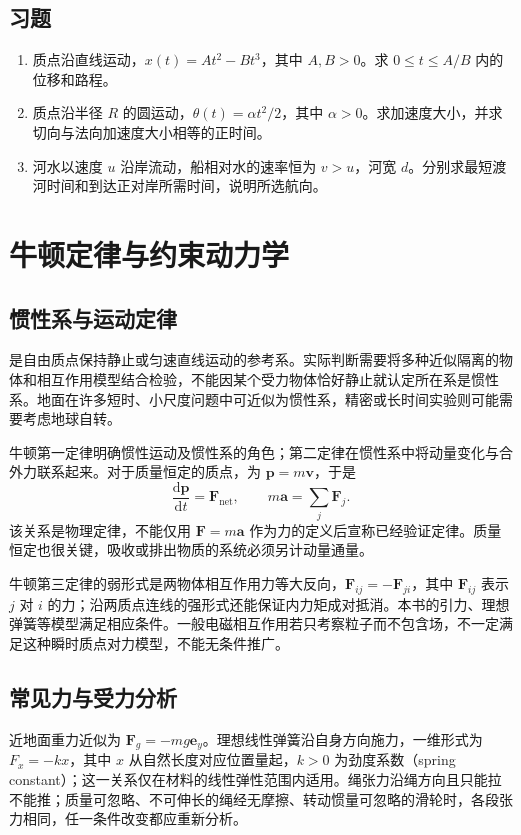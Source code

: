 \documentclass[UTF8,12pt,a4paper,fontset=fandol]{ctexbook}
\begin{document}
\section{习题}
\begin{enumerate}[label=\thechapter.\arabic*,ref=\thechapter.\arabic*]
\item\label{exr:mech-path} 质点沿直线运动，$x(t)=At^2-Bt^3$，其中 $A,B>0$。求 $0\le t\le A/B$ 内的位移和路程。
\item\label{exr:mech-circle} 质点沿半径 $R$ 的圆运动，$\theta(t)=\alpha t^2/2$，其中 $\alpha>0$。求加速度大小，并求切向与法向加速度大小相等的正时间。
\item\label{exr:mech-river} 河水以速度 $u$ 沿岸流动，船相对水的速率恒为 $v>u$，河宽 $d$。分别求最短渡河时间和到达正对岸所需时间，说明所选航向。
\end{enumerate}

\chapter{牛顿定律与约束动力学}
\label{chap:mech-newton}

\section{惯性系与运动定律}
是自由质点保持静止或匀速直线运动的参考系。实际判断需要将多种近似隔离的物体和相互作用模型结合检验，不能因某个受力物体恰好静止就认定所在系是惯性系。地面在许多短时、小尺度问题中可近似为惯性系，精密或长时间实验则可能需要考虑地球自转。

牛顿第一定律明确惯性运动及惯性系的角色；第二定律在惯性系中将动量变化与合外力联系起来。对于质量恒定的质点，为 $\mathbf p=m\mathbf v$，于是
\begin{equation}
 \frac{\mathrm d\mathbf p}{\mathrm dt}=\mathbf F_{\mathrm{net}},\qquad
 m\mathbf a=\sum_j\mathbf F_j.
 \label{eq:mech-newton}
\end{equation}
该关系是物理定律，不能仅用 $\mathbf F=m\mathbf a$ 作为力的定义后宣称已经验证定律。质量恒定也很关键，吸收或排出物质的系统必须另计动量通量。

牛顿第三定律的弱形式是两物体相互作用力等大反向，$\mathbf F_{ij}=-\mathbf F_{ji}$，其中 $\mathbf F_{ij}$ 表示 $j$ 对 $i$ 的力；沿两质点连线的强形式还能保证内力矩成对抵消。本书的引力、理想弹簧等模型满足相应条件。一般电磁相互作用若只考察粒子而不包含场，不一定满足这种瞬时质点对力模型，不能无条件推广。

\section{常见力与受力分析}
近地面重力近似为 $\mathbf F_g=-mg\mathbf e_y$。理想线性弹簧沿自身方向施力，一维形式为 $F_x=-kx$，其中 $x$ 从自然长度对应位置量起，$k>0$ 为劲度系数（spring constant）；这一关系仅在材料的线性弹性范围内适用。绳张力沿绳方向且只能拉不能推；质量可忽略、不可伸长的绳经无摩擦、转动惯量可忽略的滑轮时，各段张力相同，任一条件改变都应重新分析。
\end{document}
